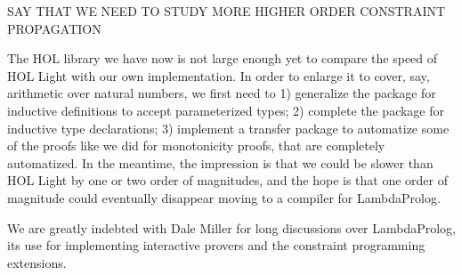 \documentclass[preprint]{sigplanconf}
\begin{document}
SAY THAT WE NEED TO STUDY MORE HIGHER ORDER CONSTRAINT PROPAGATION

The HOL library we have now is not large enough yet to compare the speed of HOL Light with our own implementation. In order to enlarge it to cover, say, arithmetic over natural numbers, we first need to 1) generalize the package for inductive definitions to accept parameterized types; 2) complete the package for inductive type declarations; 3) implement a transfer package to automatize some of the proofs like we did for monotonicity proofs, that are completely automatized. In the meantime, the impression is that we could be slower than HOL Light by one or two order of magnitudes, and the hope is that one order of magnitude could eventually disappear moving to a compiler for LambdaProlog.




\acks

We are greatly indebted with Dale Miller for long discussions over LambdaProlog, its use for implementing interactive provers and the constraint programming extensions.



\end{document}
